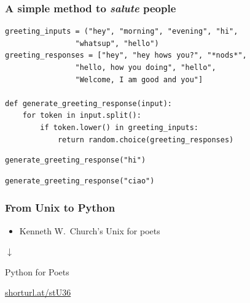 \documentclass{beamer}
\begin{document}
\begin{frame}[fragile]
\frametitle{A simple method to \textit{salute} people}
\vspace{5mm}

\begin{block}{}
\begin{verbatim}
greeting_inputs = ("hey", "morning", "evening", "hi",
                "whatsup", "hello")
greeting_responses = ["hey", "hey hows you?", "*nods*",
                "hello, how you doing", "hello",
                "Welcome, I am good and you"]

def generate_greeting_response(input):
    for token in input.split():
        if token.lower() in greeting_inputs:
            return random.choice(greeting_responses)
\end{verbatim}
\end{block}
\pause

\begin{block}{}
\begin{verbatim}
generate_greeting_response("hi")
\end{verbatim}
\end{block}
\pause 

\begin{block}{}
\begin{verbatim}
generate_greeting_response("ciao")

\end{verbatim}
\end{block}


\end{frame}



\begin{frame}

\frametitle{From Unix to Python}

\begin{itemize}
  \item Kenneth W.\ Church's \alert{Unix for poets}
\end{itemize}
\medskip
\pause

\centering

$\downarrow$
\medskip

\alert{Python for Poets}

\pause

\bigskip
\centering
\url{shorturl.at/stU36}


\end{frame}
\end{document}
